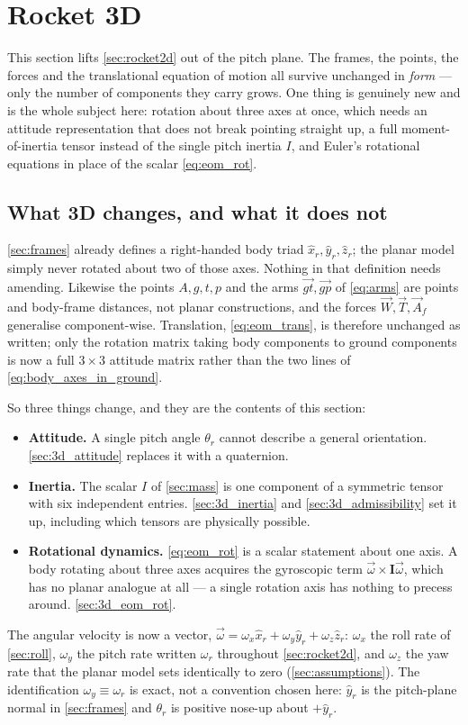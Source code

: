 \section{Rocket 3D}\label{sec:rocket3d}
This section lifts \autoref{sec:rocket2d} out of the pitch plane. The frames, the points, the
forces and the translational equation of motion all survive unchanged in \emph{form} --- only the
number of components they carry grows. One thing is genuinely new and is the whole subject here:
rotation about three axes at once, which needs an attitude representation that does not break
pointing straight up, a full moment-of-inertia tensor instead of the single pitch inertia $I$, and
Euler's rotational equations in place of the scalar \autoref{eq:eom_rot}.

\subsection{What 3D changes, and what it does not}\label{sec:3d_scope}
\autoref{sec:frames} already defines a right-handed body triad
$\hat{x}_r,\hat{y}_r,\hat{z}_r$; the planar model simply never rotated about two of those axes.
Nothing in that definition needs amending. Likewise the points $A,g,t,p$ and the arms
$\vec{gt},\vec{gp}$ of \autoref{eq:arms} are points and body-frame distances, not planar
constructions, and the forces $\vec{W},\vec{T},\vec{A}_f$ generalise component-wise. Translation,
\autoref{eq:eom_trans}, is therefore unchanged as written; only the rotation matrix taking body
components to ground components is now a full $3\times3$ attitude matrix rather than the two lines
of \autoref{eq:body_axes_in_ground}.

So three things change, and they are the contents of this section:
\begin{itemize}
    \item \textbf{Attitude.} A single pitch angle $\theta_r$ cannot describe a general orientation.
    \autoref{sec:3d_attitude} replaces it with a quaternion.
    \item \textbf{Inertia.} The scalar $I$ of \autoref{sec:mass} is one component of a symmetric
    tensor with six independent entries. \autoref{sec:3d_inertia} and
    \autoref{sec:3d_admissibility} set it up, including which tensors are physically possible.
    \item \textbf{Rotational dynamics.} \autoref{eq:eom_rot} is a scalar statement about one axis.
    A body rotating about three axes acquires the gyroscopic term $\vec\omega\times\mathbf{I}
    \vec\omega$, which has no planar analogue at all --- a single rotation axis has nothing to
    precess around. \autoref{sec:3d_eom_rot}.
\end{itemize}
The angular velocity is now a vector, $\vec\omega = \omega_x\hat{x}_r + \omega_y\hat{y}_r +
\omega_z\hat{z}_r$: $\omega_x$ the roll rate of \autoref{sec:roll}, $\omega_y$ the pitch rate
written $\omega_r$ throughout \autoref{sec:rocket2d}, and $\omega_z$ the yaw rate that the planar
model sets identically to zero (\autoref{sec:assumptions}). The identification
$\omega_y\equiv\omega_r$ is exact, not a convention chosen here: $\hat{y}_r$ is the pitch-plane
normal in \autoref{sec:frames} and $\theta_r$ is positive nose-up about $+\hat{y}_r$.

